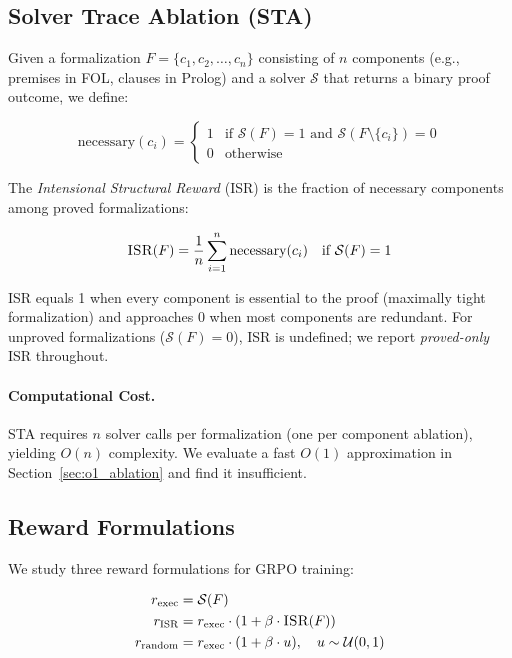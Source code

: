 \documentclass[11pt,a4paper]{article}
\newcommand{\isr}{\textsc{ISR}}
\newcommand{\sta}{\textsc{STA}}
\begin{document}
\subsection{Solver Trace Ablation (\sta{})}

Given a formalization $F = \{c_1, c_2, \ldots, c_n\}$ consisting of $n$ components (e.g., premises in FOL, clauses in Prolog) and a solver $\mathcal{S}$ that returns a binary proof outcome, we define:

\begin{equation}
\text{necessary}(c_i) = \begin{cases} 1 & \text{if } \mathcal{S}(F) = 1 \text{ and } \mathcal{S}(F \setminus \{c_i\}) = 0 \\ 0 & \text{otherwise} \end{cases}
\end{equation}

The \emph{Intensional Structural Reward} (\isr{}) is the fraction of necessary components among proved formalizations:

\begin{equation}
\isr{}(F) = \frac{1}{n} \sum_{i=1}^{n} \text{necessary}(c_i) \quad \text{if } \mathcal{S}(F) = 1
\end{equation}

\isr{} equals 1 when every component is essential to the proof (maximally tight formalization) and approaches 0 when most components are redundant.
For unproved formalizations ($\mathcal{S}(F) = 0$), \isr{} is undefined; we report \emph{proved-only} \isr{} throughout.

\paragraph{Computational Cost.}
\sta{} requires $n$ solver calls per formalization (one per component ablation), yielding $O(n)$ complexity.
We evaluate a fast $O(1)$ approximation in Section~\ref{sec:o1_ablation} and find it insufficient.

\subsection{Reward Formulations}

We study three reward formulations for GRPO training:

\begin{align}
r_{\text{exec}} &= \mathcal{S}(F) \label{eq:exec} \\
r_{\text{ISR}} &= r_{\text{exec}} \cdot (1 + \beta \cdot \isr{}(F)) \label{eq:isr} \\
r_{\text{random}} &= r_{\text{exec}} \cdot (1 + \beta \cdot u) , \quad u \sim \mathcal{U}(0,1) \label{eq:random}
\end{align}
\end{document}
